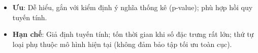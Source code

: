\begin{vidu}[title={Hình minh họa}]
\end{vidu}

\begin{tinhchat}[title={Ưu và hạn chế}]
\begin{itemize}
  \item \textbf{Ưu}: Dễ hiểu, gắn với kiểm định ý nghĩa thống kê (p-value); phù hợp hồi quy tuyến tính.
  \item \textbf{Hạn chế}: Giả định tuyến tính; tốn thời gian khi số đặc trưng rất lớn; thứ tự loại phụ thuộc mô hình hiện tại (không đảm bảo tập tối ưu toàn cục).
\end{itemize}
\end{tinhchat}
